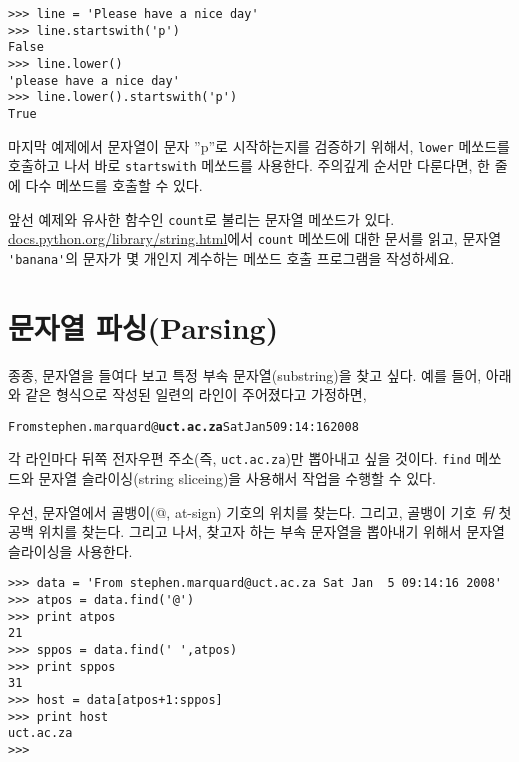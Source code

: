 \beforeverb
\begin{verbatim}
>>> line = 'Please have a nice day'
>>> line.startswith('p')
False
>>> line.lower()
'please have a nice day'
>>> line.lower().startswith('p')
True
\end{verbatim}
\afterverb
%

마지막 예제에서 문자열이 문자 ''p''로 시작하는지를 검증하기 위해서, 
{\tt lower} 메쏘드를 호출하고 나서 바로 {\tt startswith} 메쏘드를 사용한다.
주의깊게 순서만 다룬다면, 한 줄에 다수 메쏘드를 호출할 수 있다.

\begin{ex}

앞선 예제와 유사한 함수인 {\tt count}로 불리는 문자열 메쏘드가 있다.
\url{docs.python.org/library/string.html}에서 {\tt count} 메쏘드에 대한 문서를 읽고,
문자열 \verb"'banana'"의 문자가 몇 개인지 계수하는 메쏘드 호출 프로그램을 작성하세요.

\end{ex}

\section{    문자열 파싱(Parsing)}

종종, 문자열을 들여다 보고 특정 부속 문자열(substring)을 찾고 싶다. 
예를 들어, 아래와 같은 형식으로 작성된 일련의 라인이 주어졌다고 가정하면,

\beforeverb
\begin{alltt}
From stephen.marquard@{\bf uct.ac.za} Sat Jan  5 09:14:16 2008
\end{alltt}
\afterverb

각 라인마다 뒤쪽 전자우편 주소(즉, {\tt uct.ac.za})만 뽑아내고 싶을 것이다.
{\tt find} 메쏘드와 문자열 슬라이싱(string sliceing)을 사용해서 작업을 수행할 수 있다.

우선, 문자열에서 골뱅이(@, at-sign) 기호의 위치를 찾는다. 
그리고, 골뱅이 기호 \emph{뒤} 첫 공백 위치를 찾는다. 
그리고 나서, 찾고자 하는 부속 문자열을 뽑아내기 위해서 문자열 슬라이싱을 사용한다.

\beforeverb
\begin{verbatim}
>>> data = 'From stephen.marquard@uct.ac.za Sat Jan  5 09:14:16 2008'
>>> atpos = data.find('@')
>>> print atpos
21
>>> sppos = data.find(' ',atpos)
>>> print sppos
31
>>> host = data[atpos+1:sppos]
>>> print host
uct.ac.za
>>> 
\end{verbatim}
\afterverb
%

